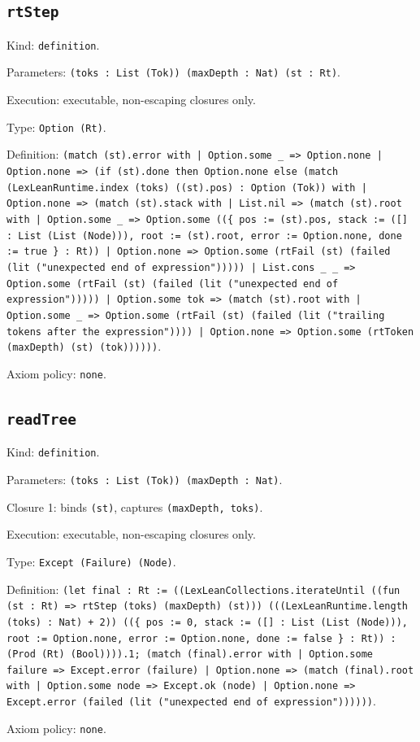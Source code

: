 \documentclass[11pt]{article}
\begin{document}
\subsection*{\texttt{rtStep}}
\noindent Kind: \texttt{definition}.\par
\noindent Parameters: \texttt{(toks : List (Tok)) (maxDepth : Nat) (st : Rt)}.\par
\noindent Execution: executable, non-escaping closures only.\par
\noindent Type: \texttt{Option (Rt)}.\par
\noindent Definition: \texttt{(match (st).error with | Option.some \_ => Option.none | Option.none => (if (st).done then Option.none else (match (LexLeanRuntime.index (toks) ((st).pos) : Option (Tok)) with | Option.none => (match (st).stack with | List.nil => (match (st).root with | Option.some \_ => Option.some ((\{ pos := (st).pos, stack := ([] : List (List (Node))), root := (st).root, error := Option.none, done := true \} : Rt)) | Option.none => Option.some (rtFail (st) (failed (lit ("unexpected end of expression"))))) | List.cons \_ \_ => Option.some (rtFail (st) (failed (lit ("unexpected end of expression"))))) | Option.some tok => (match (st).root with | Option.some \_ => Option.some (rtFail (st) (failed (lit ("trailing tokens after the expression")))) | Option.none => Option.some (rtToken (maxDepth) (st) (tok))))))}.\par
\noindent Axiom policy: \texttt{none}.\par
\subsection*{\texttt{readTree}}
\noindent Kind: \texttt{definition}.\par
\noindent Parameters: \texttt{(toks : List (Tok)) (maxDepth : Nat)}.\par
\noindent Closure 1: binds \texttt{(st)}, captures \texttt{(maxDepth, toks)}.\par
\noindent Execution: executable, non-escaping closures only.\par
\noindent Type: \texttt{Except (Failure) (Node)}.\par
\noindent Definition: \texttt{(let final : Rt := ((LexLeanCollections.iterateUntil ((fun (st : Rt) => rtStep (toks) (maxDepth) (st))) (((LexLeanRuntime.length (toks) : Nat) + 2)) ((\{ pos := 0, stack := ([] : List (List (Node))), root := Option.none, error := Option.none, done := false \} : Rt)) : (Prod (Rt) (Bool)))).1; (match (final).error with | Option.some failure => Except.error (failure) | Option.none => (match (final).root with | Option.some node => Except.ok (node) | Option.none => Except.error (failed (lit ("unexpected end of expression"))))))}.\par
\noindent Axiom policy: \texttt{none}.\par
\end{document}
